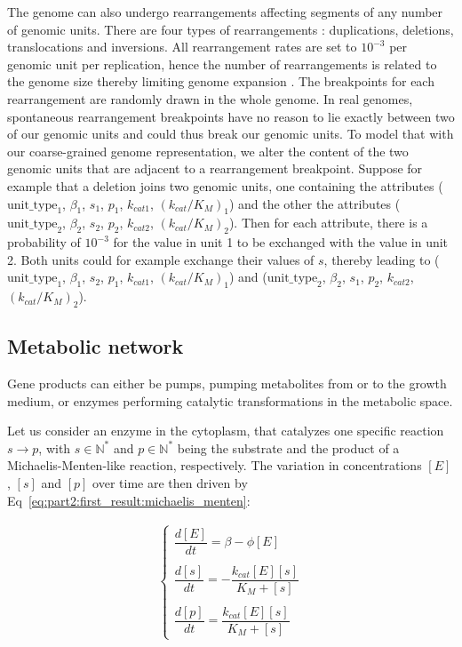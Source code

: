 The genome can also undergo rearrangements affecting segments of any number of genomic units. There are four types of rearrangements : duplications, deletions, translocations and inversions. All rearrangement rates are set to $10^{-3}$ per genomic unit per replication, hence the number of rearrangements is related to the genome size thereby limiting genome expansion \citep{fischer-et-al-2014}.
The breakpoints for each rearrangement are randomly drawn in the whole genome.
In real genomes, spontaneous rearrangement breakpoints have no reason to lie exactly between two of our genomic units and could thus break our genomic units. To model that with our coarse-grained genome representation, we alter the content of the two genomic units that are adjacent to a rearrangement breakpoint. Suppose for example that a deletion joins two genomic units, one containing the attributes ($\text{unit\_type}_1$, $\beta_1$, $s_1$, $p_1$, $k_{cat1}$, $(k_{cat}/K_M)_1$) and the other the attributes ($\text{unit\_type}_2$, $\beta_2$, $s_2$, $p_2$, $k_{cat2}$, $(k_{cat}/K_M)_2$). Then for each attribute, there is a probability of $10^{-3}$ for the value in unit 1 to be exchanged with the value in unit 2. Both units could for example exchange their values of $s$, thereby leading to ($\text{unit\_type}_1$, $\beta_1$, $s_2$, $p_1$, $k_{cat1}$, $(k_{cat}/K_M)_1$) and ($\text{unit\_type}_2$, $\beta_2$, $s_1$, $p_2$, $k_{cat2}$, $(k_{cat}/K_M)_2$).


\subsection{Metabolic network}

Gene products can either be pumps, pumping metabolites from or to the growth medium, or enzymes performing catalytic transformations in the metabolic space.
 
Let us consider an enzyme in the cytoplasm, that catalyzes one specific reaction $s \rightarrow p$, with $s \in \mathbb{N}^*$ and $p \in \mathbb{N}^*$ being the substrate and the product of a Michaelis-Menten-like reaction, respectively. The variation in concentrations $[E]$, $[s]$ and $[p]$ over time are then driven by Eq~\ref{eq:part2:first_result:michaelis_menten}:

\begin{eqnarray}
\label{eq:part2:first_result:michaelis_menten}
\left\{
\begin{array}{lcr}
\dfrac{d[E]}{dt} = \beta - \phi[E]\\\\
\dfrac{d[s]}{dt} = -\dfrac{k_{cat}[E][s]}{K_M+[s]}\\\\
\dfrac{d[p]}{dt} = \dfrac{k_{cat}[E][s]}{K_M+[s]}
\end{array}
\right.
\end{eqnarray}

